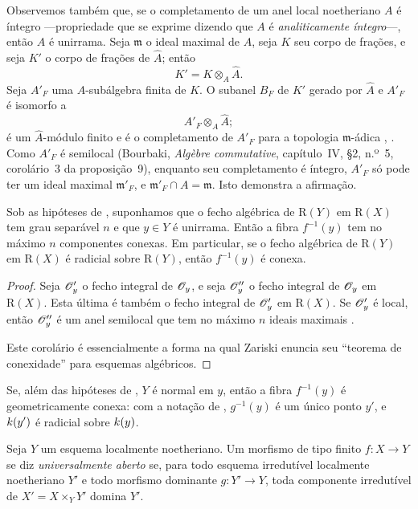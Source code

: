 Observemos também que, se o completamento de um anel local
noetheriano $A$ é íntegro ---propriedade que se exprime dizendo que
$A$ é \emph{analiticamente íntegro}---, então $A$ é unirrama.
Seja $\mathfrak{m}$ o ideal maximal de $A$, seja $K$ seu corpo de
frações, e seja $K'$ o corpo de frações de $\widehat{A}$;
então
\[
  K'=K\otimes_A\widehat{A}.
\]
Seja $A'_F$ uma $A$-subálgebra finita de $K$. O subanel $B_F$ de
$K'$ gerado por $\widehat{A}$ e $A'_F$ é isomorfo a
\[
  A'_F\otimes_A\widehat{A};
\]
é um $\widehat{A}$-módulo finito e é o completamento de $A'_F$
para a topologia $\mathfrak{m}$-ádica
, . Como $A'_F$ é semilocal
(Bourbaki, \emph{Alg\`ebre commutative}, capítulo~IV, \S2, n.º~5,
corolário~3 da proposição~9), enquanto seu completamento é
íntegro, $A'_F$ só pode ter um ideal maximal $\mathfrak{m}'_F$, e
$\mathfrak{m}'_F\cap A=\mathfrak{m}$. Isto demonstra a afirmação.

\begin{corollary}[4.3.7]
\label{III.4.3.7}
Sob as hipóteses de , suponhamos que o fecho
algébrica de $\mathrm{R}(Y)$ em $\mathrm{R}(X)$ tem grau separável
$n$ e que $y\in Y$ é unirrama. Então a fibra $f^{-1}(y)$ tem no
máximo $n$ componentes conexas. Em particular, se o fecho
algébrica de $\mathrm{R}(Y)$ em $\mathrm{R}(X)$ é radicial sobre
$\mathrm{R}(Y)$, então $f^{-1}(y)$ é conexa.
\end{corollary}

\begin{proof}
Seja $\mathscr{O}'_y$ o fecho integral de $\mathscr{O}_y$, e seja
$\mathscr{O}''_y$ o fecho integral de $\mathscr{O}_y$ em $\mathrm{R}(X)$.
Esta última é também o fecho integral de $\mathscr{O}'_y$ em
$\mathrm{R}(X)$. Se $\mathscr{O}'_y$ é local, então $\mathscr{O}''_y$ é
um anel semilocal que tem no máximo $n$ ideais maximais
\cite[vol.~I, p.~289, Theorem~22]{I-13}.

Este corolário é essencialmente a forma na qual Zariski enuncia seu
``teorema de conexidade'' para esquemas algébricos.
\end{proof}

\begin{remark}[4.3.8]
\label{III.4.3.8}
Se, além das hipóteses de , $Y$ é normal em
$y$, então a fibra $f^{-1}(y)$ é geometricamente conexa: com a
notação de , $g^{-1}(y)$ é um único ponto $y'$, e
$k(y')$ é radicial sobre $k(y)$.
\end{remark}

\begin{definition}[4.3.9]
\label{III.4.3.9}
Seja $Y$ um esquema localmente noetheriano. Um morfismo de tipo finito
$f:X\to Y$ se diz \emph{universalmente aberto} se, para todo esquema
irredutível localmente noetheriano $Y'$ e todo morfismo dominante
$g:Y'\to Y$, toda componente irredutível de
$X'=X\times_Y Y'$ domina $Y'$.
\end{definition}

